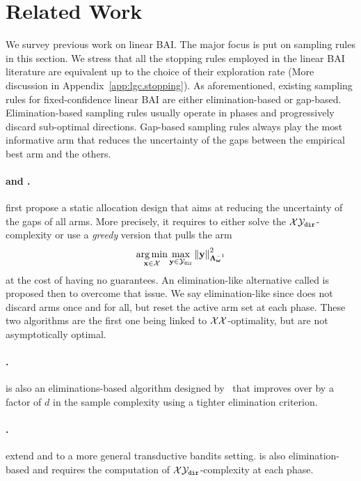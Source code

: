 \section{Related Work}\label{sec:lgc.related_work}

We survey previous work on linear BAI. The major focus is put on sampling rules in this section. We stress that all the stopping rules employed in the linear BAI literature are equivalent up to the choice of their exploration rate (More discussion in Appendix~\ref{app:lgc.stopping}). As aforementioned, existing sampling rules for fixed-confidence linear BAI are either elimination-based or gap-based. Elimination-based sampling rules usually operate in phases and progressively discard sub-optimal directions. Gap-based sampling rules always play the most informative arm that reduces the uncertainty of the gaps between the empirical best arm and the others.

\paragraph{\XYS and \XYA.} \citet{soare2014linear} first propose a static allocation design \XYS that aims at reducing the uncertainty of the gaps of all arms. More precisely, it requires to either solve the $\mathcal{X}\mathcal{Y}_{\texttt{dir}}$-complexity or use a \emph{greedy} version that pulls the arm 
\[
    \operatorname*{arg\,min}_{{\bf x}\in\mathcal{X}} \max_{{\bf y}\in\mathcal{Y}_{\texttt{dir}}} \left\lVert{\bf y}\right\rVert_{{\boldsymbol \Lambda}_{{\boldsymbol \omega}}^{-1}}^2
\]
at the cost of having no guarantees. An elimination-like alternative called \XYA is proposed then to overcome that issue. We say elimination-like since \XYA does not discard arms once and for all, but reset the active arm set at each phase. These two algorithms are the first one being linked to $\mathcal{X}\mathcal{X}$-optimality, but are not asymptotically optimal.

\paragraph{\ALBA.} \ALBA is also an eliminations-based algorithm designed by~\citet{tao2018alba} that improves over \XYA by a factor of $d$ in the sample complexity using a tighter elimination criterion.
\vspace{-0.2cm}

\paragraph{\RAGE.} \citet{fiez2019transductive} extend \XYS and \XYA to a more general transductive bandits setting. \RAGE is also elimination-based and requires the computation of $\mathcal{X}\mathcal{Y}_{\texttt{dir}}$-complexity at each phase.

